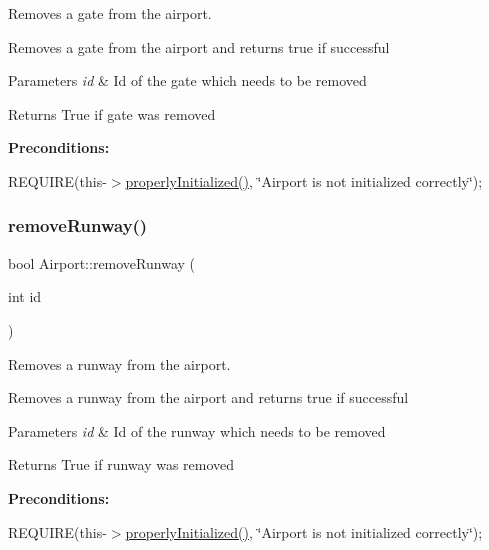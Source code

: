 Removes a gate from the airport. 

Removes a gate from the airport and returns true if successful


\begin{DoxyParams}{Parameters}
{\em id} & Id of the gate which needs to be removed \\
\hline
\end{DoxyParams}
\begin{DoxyReturn}{Returns}
True if gate was removed
\end{DoxyReturn}
{\bfseries Preconditions\+:}
\begin{DoxyItemize}
\item R\+E\+Q\+U\+I\+RE(this-\/$>$\mbox{\hyperlink{class_airport_aa13e68ac58e8875837fbe888325cfff6}{properly\+Initialized()}}, \char`\"{}\+Airport is not initialized correctly\char`\"{}); 
\end{DoxyItemize}\mbox{\label{class_airport_adb2735f0f7402bdf3946b17b10498b67}} 
\subsubsection{\texorpdfstring{remove\+Runway()}{removeRunway()}}
{\footnotesize\ttfamily bool Airport\+::remove\+Runway (\begin{DoxyParamCaption}\item[{int}]{id }\end{DoxyParamCaption})}



Removes a runway from the airport. 

Removes a runway from the airport and returns true if successful


\begin{DoxyParams}{Parameters}
{\em id} & Id of the runway which needs to be removed \\
\hline
\end{DoxyParams}
\begin{DoxyReturn}{Returns}
True if runway was removed
\end{DoxyReturn}
{\bfseries Preconditions\+:}
\begin{DoxyItemize}
\item R\+E\+Q\+U\+I\+RE(this-\/$>$\mbox{\hyperlink{class_airport_aa13e68ac58e8875837fbe888325cfff6}{properly\+Initialized()}}, \char`\"{}\+Airport is not initialized correctly\char`\"{}); 
\end{DoxyItemize}\mbox{\label{class_airport_a211a2877b1d654a9a50b28f260eec159}} 
